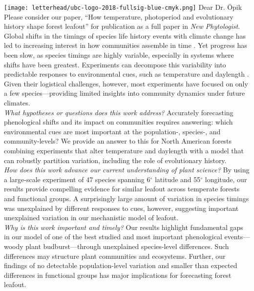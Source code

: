 \documentclass[11pt,a4paper]{article}
\begin{document}
\noindent \texttt{[image: letterhead/ubc-logo-2018-fullsig-blue-cmyk.png]}
\noindent Dear Dr. Öpik
\vspace{1.5ex}\\
\noindent Please consider our paper, ``How temperature, photoperiod and evolutionary history shape forest leafout'' for publication as a full paper in \emph{New Phytologist}. 
\vspace{1.5ex}\\ 
Global shifts in the timings of species life history events with climate change has led to increasing interest in how communities assemble in time \citep{Cope2022, Cleland2024}. Yet progress has been slow, as species timings are highly variable, especially in systems where shifts have been greatest. Experiments can decompose this variability into predictable responses to environmental cues, such as temperature and daylength \citep{Basler2014,Vitasse2014,Zohner2016}. Given their logistical challenges, however, most experiments have focused on only a few species---providing limited insights into community dynamics under future climates.
\vspace{1.5ex}\\ 
\noindent \textit{What hypotheses or questions does this work address?} Accurately forecasting phenological shifts and its impact on communities requires answering: which environmental cues are most important at the population-, species-, and community-levels? We provide an answer to this for North American forests combining experiments that alter temperature and daylength with a model that can robustly partition variation, including the role of evolutionary history. 
\vspace{1.5ex}\\ 
\noindent \textit{How does this work advance our current understanding of plant science?}  By using a large-scale experiment of 47 species spanning 6$^{\circ}$ latitude and 55$^{\circ}$ longitude, our results provide compelling evidence for similar leafout across temperate forests and functional groups. A surprisingly large amount of variation in species timings was unexplained by different responses to cues, however, suggesting important unexplained variation in our mechanistic model of leafout.  
\vspace{1.5ex}\\
\noindent \textit{Why is this work important and timely?} Our results highlight fundamental gaps in our model of one of the best studied and most important phenological events---woody plant budburst---through unexplained species-level differences. Such differences may structure plant communities and ecosystems. Further, our findings of no detectable population-level variation and smaller than expected differences in functional groups has major implications for forecasting forest leafout. %
\end{document}
